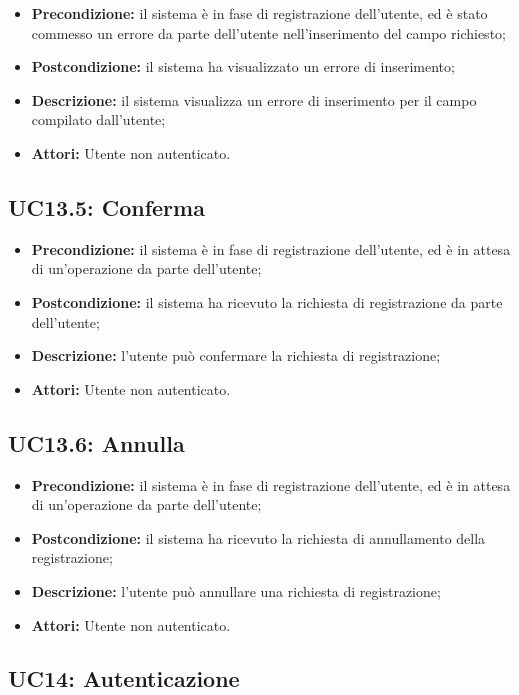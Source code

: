 \begin{itemize}
	\item \textbf{Precondizione:} il sistema è in fase di registrazione dell'utente, ed è stato commesso un errore da parte dell'utente nell'inserimento del campo richiesto;
	\item \textbf{Postcondizione:} il sistema ha visualizzato un errore di inserimento;
	\item \textbf{Descrizione:} il sistema visualizza un errore di inserimento per il campo compilato dall'utente;
	\item \textbf{Attori:} Utente non autenticato.
\end{itemize}
\subsection{ UC13.5: Conferma}

\begin{itemize}
	\item \textbf{Precondizione:} il sistema è in fase di registrazione dell'utente, ed è in attesa di un'operazione da parte dell'utente;
	\item \textbf{Postcondizione:} il sistema ha ricevuto la richiesta di registrazione da parte dell'utente;
	\item \textbf{Descrizione:} l'utente può confermare la richiesta di registrazione;
	\item \textbf{Attori:} Utente non autenticato.
\end{itemize}
\subsection{ UC13.6: Annulla}

\begin{itemize}
	\item \textbf{Precondizione:} il sistema è in fase di registrazione dell'utente, ed è in attesa di un'operazione da parte dell'utente;
	\item \textbf{Postcondizione:} il sistema ha ricevuto la richiesta di annullamento della registrazione;
	\item \textbf{Descrizione:} l'utente può annullare una richiesta di registrazione;
	\item \textbf{Attori:} Utente non autenticato.
\end{itemize}
\subsection{ UC14: Autenticazione}


